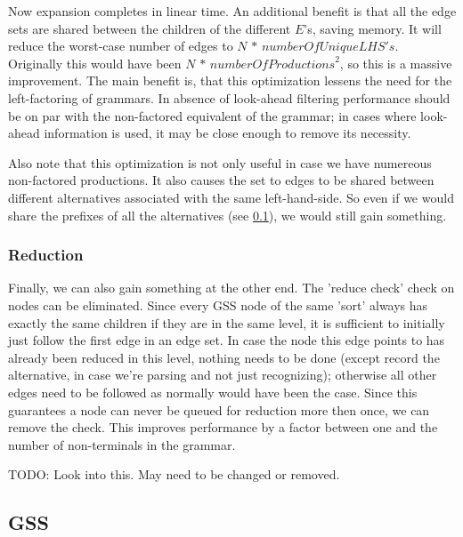 \documentclass[a4paper,10pt]{article}
\begin{document}
Now expansion completes in linear time. An additional benefit is that all the edge sets are shared between the children of the different $E$'s, saving memory. It will reduce the worst-case number of edges to $N\,*\,\mathit{numberOfUniqueLHS's}$. Originally this would have been $N\,*\,\mathit{numberOfProductions}^2$, so this is a massive improvement. The main benefit is, that this optimization lessens the need for the left-factoring of grammars. In absence of look-ahead filtering performance should be on par with the non-factored equivalent of the grammar; in cases where look-ahead information is used, it may be close enough to remove its necessity.

Also note that this optimization is not only useful in case we have numereous non-factored productions. It also causes the set to edges to be shared between different alternatives associated with the same left-hand-side. So even if we would share the prefixes of all the alternatives (see \ref{sec:prefixSharing}), we would still gain something.

\subsubsection{Reduction}
Finally, we can also gain something at the other end. The 'reduce check' check on nodes can be eliminated. Since every GSS node of the same 'sort' always has exactly the same children if they are in the same level, it is sufficient to initially just follow the first edge in an edge set. In case the node this edge points to has already been reduced in this level, nothing needs to be done (except record the alternative, in case we're parsing and not just recognizing); otherwise all other edges need to be followed as normally would have been the case. Since this guarantees a node can never be queued for reduction more then once, we can remove the check. This improves performance by a factor between one and the number of non-terminals in the grammar.

TODO: Look into this. May need to be changed or removed.

\subsection{GSS}
\label{sec:prefixSharing}
\end{document}
